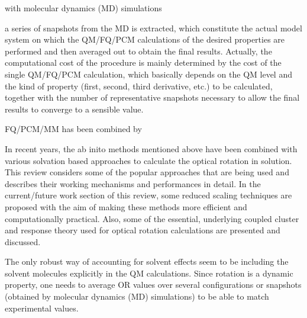 with molecular dynamics (MD) simulations



 a series of snapshots from the MD is extracted, which constitute the actual model system on which the QM/FQ/PCM calculations of the desired properties are performed and then averaged out to obtain the final results. Actually, the computational cost of the procedure is mainly determined by the cost of the single QM/FQ/PCM calculation, which basically depends on the QM level and the kind of property (first, second, third derivative, etc.) to be calculated, together with the number of representative snapshots necessary to allow the final results to converge to a sensible value.



FQ/PCM/MM has been combined by

In recent years, the ab inito methods
mentioned above have been combined with various solvation based
approaches\cite{Neugebauer05,Neugebauer09,Mennucci02,Tomasi05,JensenGordon96}
to calculate the optical rotation in solution. This review considers some of
the popular approaches that are being used and describes their working
mechanisms and performances in detail. In the current/future work section of
this review, some reduced scaling techniques are proposed with the aim of
making these methods more efficient and computationally practical. Also, some
of the essential, underlying coupled cluster and response theory used for
optical rotation calculations are presented and discussed.



The only robust way of accounting for solvent effects seem to be including the solvent molecules explicitly 
in the QM calculations. Since rotation is a dynamic property, one needs to average OR values over several 
configurations or snapshots (obtained by molecular dynamics (MD) simulations) to be able to match experimental 
values.

